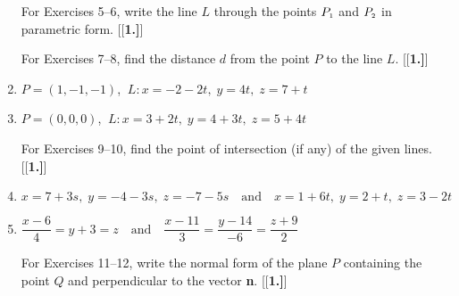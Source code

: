 \begin{enumerate}[\bfseries 1.]
\par\noindent For Exercises 5--6, write the line $L$ through the points $P_{\scriptscriptstyle 1}$ and $P_{\scriptscriptstyle 2}$ in parametric
form.
[{[\bfseries 1.]}]
\par\noindent For Exercises 7--8, find the distance $d$ from the point $P$ to the line $L$.
[{[\bfseries 1.]}]
 \item $P = (1,-1,-1)$, $~L: x = -2 - 2t, \; y = 4t, \; z = 7 + t$
 \item $P = (0,0,0)$, $~L: x = 3 + 2t, \; y = 4 + 3t, \; z = 5 + 4t$
\par\noindent For Exercises 9--10, find the point of intersection (if any) of the given lines.
[{[\bfseries 1.]}]
 \item $x = 7 + 3s, \; y = -4 - 3s, \; z = -7 - 5s \quad \text{and} \quad x = 1 + 6t, \; y = 2 + t, \; z = 3 - 2t$
 \item $\dfrac{x - 6}{4} = y + 3 = z \quad \text{and} \quad \dfrac{x - 11}{3} = \dfrac{y - 14}{-6} =
  \dfrac{z + 9}{2}$
\par\noindent For Exercises 11--12, write the normal form of the plane $P$ containing the point $Q$ and
perpendicular to the vector \textbf{n}.
[{[\bfseries 1.]}]

\end{enumerate}
